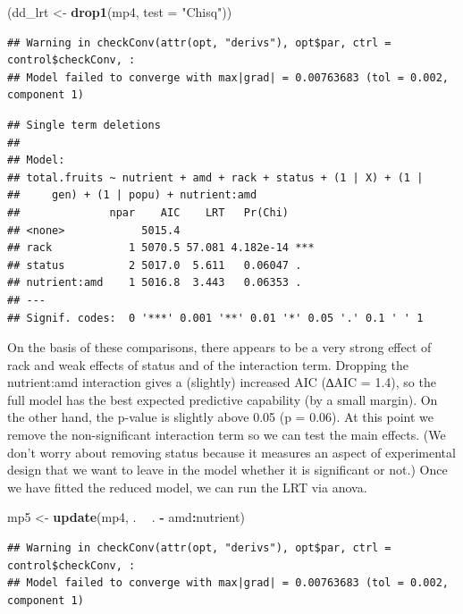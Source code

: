\documentclass[
  12pt,
]{book}
\newenvironment{Shaded}{\begin{snugshade}}{\end{snugshade}}
\newcommand{\DataTypeTok}[1]{\textcolor[rgb]{0.13,0.29,0.53}{#1}}
\newcommand{\KeywordTok}[1]{\textcolor[rgb]{0.13,0.29,0.53}{\textbf{#1}}}
\newcommand{\NormalTok}[1]{#1}
\newcommand{\OperatorTok}[1]{\textcolor[rgb]{0.81,0.36,0.00}{\textbf{#1}}}
\newcommand{\StringTok}[1]{\textcolor[rgb]{0.31,0.60,0.02}{#1}}
\begin{document}
\begin{Shaded}
\begin{Highlighting}[]
\NormalTok{(dd_lrt <-}\StringTok{ }\KeywordTok{drop1}\NormalTok{(mp4, }\DataTypeTok{test =} \StringTok{"Chisq"}\NormalTok{))}
\end{Highlighting}
\end{Shaded}

\begin{verbatim}
## Warning in checkConv(attr(opt, "derivs"), opt$par, ctrl = control$checkConv, :
## Model failed to converge with max|grad| = 0.00763683 (tol = 0.002, component 1)
\end{verbatim}

\begin{verbatim}
## Single term deletions
## 
## Model:
## total.fruits ~ nutrient + amd + rack + status + (1 | X) + (1 | 
##     gen) + (1 | popu) + nutrient:amd
##              npar    AIC    LRT   Pr(Chi)    
## <none>            5015.4                     
## rack            1 5070.5 57.081 4.182e-14 ***
## status          2 5017.0  5.611   0.06047 .  
## nutrient:amd    1 5016.8  3.443   0.06353 .  
## ---
## Signif. codes:  0 '***' 0.001 '**' 0.01 '*' 0.05 '.' 0.1 ' ' 1
\end{verbatim}

On the basis of these comparisons, there appears to be a very strong effect of rack and weak effects of status and of the interaction term. Dropping the nutrient:amd interaction gives a (slightly) increased AIC (∆AIC = 1.4), so the full model has the best expected predictive capability (by a small margin). On the other hand, the p-value is slightly above 0.05 (p = 0.06). At this point we remove the non-significant interaction term so we can test the main effects. (We don't worry about removing status because it measures an aspect of experimental design that we want to leave in the model whether it is significant or not.) Once we have fitted the reduced model, we can run the LRT via anova.

\begin{Shaded}
\begin{Highlighting}[]
\NormalTok{mp5 <-}\StringTok{ }\KeywordTok{update}\NormalTok{(mp4, . }\OperatorTok{~}\StringTok{ }\NormalTok{. }\OperatorTok{-}\StringTok{ }\NormalTok{amd}\OperatorTok{:}\NormalTok{nutrient)}
\end{Highlighting}
\end{Shaded}

\begin{verbatim}
## Warning in checkConv(attr(opt, "derivs"), opt$par, ctrl = control$checkConv, :
## Model failed to converge with max|grad| = 0.00763683 (tol = 0.002, component 1)
\end{verbatim}
\end{document}
